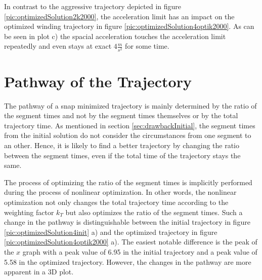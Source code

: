 In contrast to the aggressive trajectory depicted in figure \ref{pic:optimizedSolution2k2000}, the acceleration limit has an impact on the optimized winding trajectory in figure \ref{pic:optimizedSolution4optik2000}. As can be seen in plot c) the spacial acceleration touches the acceleration limit repeatedly and even stays at exact $4 \frac{m}{s^2}$ for some time. 

\section{Pathway of the Trajectory}\label{sec:pathway}

The pathway of a snap minimized trajectory is mainly determined by the ratio of the segment times and not by the segment times themselves or by the total trajectory time. As mentioned in section \ref{sec:drawbackInitial}, the segment times from the initial solution do not consider the circumstances from one segment to an other. Hence, it is likely to find a better trajectory by changing the ratio between the segment times, even if the total time of the trajectory stays the same.

The process of optimizing the ratio of the segment times is implicitly performed during the process of nonlinear optimization. In other words, the nonlinear optimization not only changes the total trajectory time according to the weighting factor $k_T$ but also optimizes the ratio of the segment times. \newline
Such a change in the pathway is distinguishable between the initial trajectory in figure \ref{pic:optimizedSolution4init} a) and the optimized trajectory in figure \ref{pic:optimizedSolution4optik2000} a). The easiest notable difference is the peak of the $x$ graph with a peak value of 6.95 in the initial trajectory and a peak value of 5.58 in the optimized trajectory. However, the changes in the pathway are more apparent in a 3D plot. 


